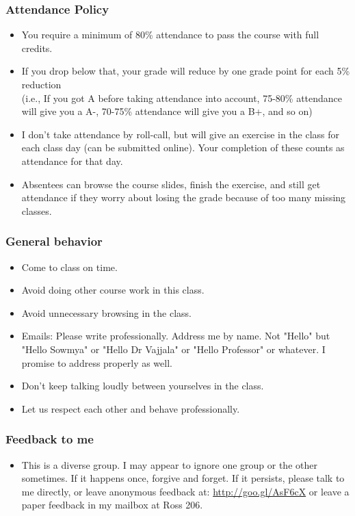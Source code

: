\documentclass{beamer}
\begin{document}
\begin{frame}
\frametitle{Attendance Policy}
\begin{itemize}
\item You require a minimum of 80\% attendance to pass the course with full credits.
\item If you drop below that, your grade will reduce by one grade point for each 5\% reduction 
\\ (i.e., If you got A before taking attendance into account, 75-80\% attendance will give you a A-, 70-75\% attendance will give you a B+, and so on)
\item I don't take attendance by roll-call, but will give an exercise in the class for each class day (can be submitted online). Your completion of these counts as attendance for that day.
\item Absentees can browse the course slides, finish the exercise, and still get attendance if they worry about losing the grade because of too many missing classes.
\end{itemize}
\end{frame}

\begin{frame}
\frametitle{General behavior}
\begin{itemize}
\item Come to class on time.
\item Avoid doing other course work in this class.
\item Avoid unnecessary browsing in the class.
\item Emails: Please write professionally. Address me by name. Not "Hello" but "Hello Sowmya" or "Hello Dr Vajjala" or "Hello Professor" or whatever.  I promise to address properly as well. 
\item Don't keep talking loudly between yourselves in the class.
\item Let us respect each other and behave professionally.
\end{itemize}
\end{frame}

\begin{frame}
\frametitle{Feedback to me}
\begin{itemize}
\item This is a diverse group. I may appear to ignore one group or the other sometimes. If it happens once, forgive and forget. If it persists, please talk to me directly, or leave anonymous feedback at: \url{http://goo.gl/AsF6cX} or leave a paper feedback in my mailbox at Ross 206.
\end{itemize}
\end{frame}
\end{document}
